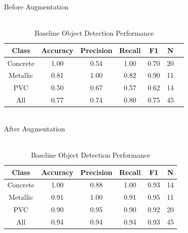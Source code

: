 \vspace{0.5\baselineskip}

\begin{table}[H]
\begin{center}

\caption{\\Baseline Object Detection Performance}
\label{table:baseline}
    Before Augmentation\\
    \begin{tabular}{ |c|c|c|c|c|c|c|}
        \hline
        Class & Accuracy & Precision & Recall & F1 & N \\
        \hline
        Concrete & 1.00 & 0.54 & 1.00 & 0.70 & 20\\ 
        Metallic & 0.81 & 1.00 & 0.82 & 0.90 & 11\\  
        PVC      & 0.50 & 0.67 & 0.57 & 0.62 & 14\\
        \hline
        All      & 0.77 & 0.74 & 0.80 & 0.75 & 45\\
        \hline
    \end{tabular} \\

    After Augmentation \\
    \begin{tabular}{ |c|c|c|c|c|c|}
        \hline
        Class & Accuracy & Precision & Recall & F1 & N \\
        \hline
        Concrete & 1.00 & 0.88 & 1.00 & 0.93 & 14\\ 
        Metallic & 0.91 & 1.00 & 0.91 & 0.95 & 11\\  
        PVC      & 0.90 & 0.95 & 0.90 & 0.92 & 20\\
        \hline
        All      & 0.94 & 0.94 & 0.94 & 0.93 & 45\\
        \hline
    \end{tabular}
\end{center}

\end{table}

